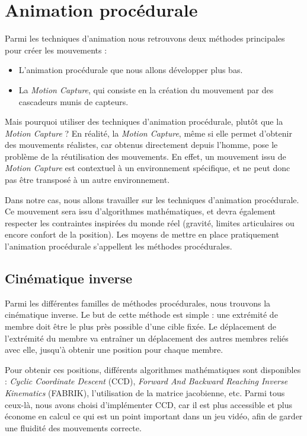 \documentclass[a4paper,11pt]{article}
\begin{document}
\section{Animation procédurale}  
Parmi les techniques d'animation nous retrouvons deux méthodes principales pour créer les mouvements : 
\begin{itemize}
	\item L'animation procédurale que nous allons développer plus bas.
	\item La \textit{Motion Capture}, qui consiste en la création du mouvement par des cascadeurs munis de capteurs. 
\end{itemize}
Mais pourquoi utiliser des techniques d'animation procédurale, plutôt que la \textit{Motion Capture} ? En réalité, la \textit{Motion Capture}, même si elle permet d'obtenir des mouvements réalistes, car obtenus directement depuis l'homme, pose le problème de la réutilisation des mouvements. En effet, un mouvement issu de \textit{Motion Capture} est contextuel à un environnement spécifique, et ne peut donc pas être transposé à un autre environnement.

Dans notre cas, nous allons travailler sur les techniques d'animation procédurale. Ce mouvement sera issu d'algorithmes mathématiques, et devra également respecter les contraintes inspirées du monde réel (gravité, limites articulaires ou encore confort de la position). Les moyens de mettre en place pratiquement l'animation procédurale s'appellent les méthodes procédurales.

\subsection{Cinématique inverse}
Parmi les différentes familles de méthodes procédurales, nous trouvons la cinématique inverse. Le but de cette méthode est simple : une extrémité de membre doit être le plus près possible d'une cible fixée. Le déplacement de l'extrémité du membre va entraîner un déplacement des autres membres reliés avec elle, jusqu'à obtenir une position pour chaque membre.


Pour obtenir ces positions, différents algorithmes mathématiques sont disponibles : \textit{Cyclic Coordinate Descent} (CCD), \textit{Forward And Backward Reaching Inverse Kinematics} (FABRIK), l'utilisation de la matrice jacobienne, etc. Parmi tous ceux-là, nous avons choisi d'implémenter CCD, car il est plus accessible et plus économe en calcul ce qui est un point important dans un jeu vidéo, afin de garder une fluidité des mouvements correcte. 
\end{document}
